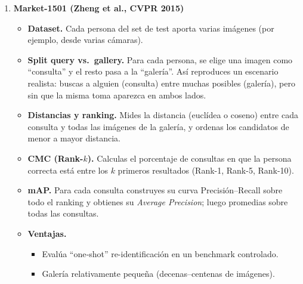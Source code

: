 \documentclass[12pt, a4paper, twoside]{article}
\begin{document}
 	\begin{enumerate}
 		\item \textbf{Market-1501 (Zheng et al., CVPR 2015)}
 		\begin{itemize}
 			\item \textbf{Dataset.}  
 			Cada persona del set de test aporta varias imágenes (por ejemplo, desde varias cámaras).
 			\item \textbf{Split query vs.\ gallery.}  
 			Para cada persona, se elige una imagen como “consulta” y el resto pasa a la “galería”.  
 			Así reproduces un escenario realista: buscas a alguien (consulta) entre muchas posibles (galería), pero sin que la misma toma aparezca en ambos lados.
 			\item \textbf{Distancias y ranking.}  
 			Mides la distancia (euclídea o coseno) entre cada consulta y todas las imágenes de la galería, y ordenas los candidatos de menor a mayor distancia.
 			\item \textbf{CMC (Rank-\(k\)).}  
 			Calculas el porcentaje de consultas en que la persona correcta está entre los \(k\) primeros resultados (Rank-1, Rank-5, Rank-10).
 			\item \textbf{mAP.}  
 			Para cada consulta construyes su curva Precisión–Recall sobre todo el ranking y obtienes su \emph{Average Precision}; luego promedias sobre todas las consultas.
 			\item \textbf{Ventajas.}
 			\begin{itemize}
 				\item Evalúa “one‐shot” re-identificación en un benchmark controlado.
 				\item Galería relativamente pequeña (decenas–centenas de imágenes).
 			\end{itemize}
 		\end{itemize}
 		

\end{enumerate}
\end{document}
